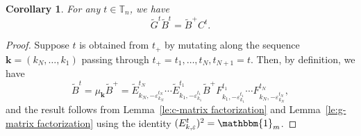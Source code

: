 \documentclass{amsart}
\newtheorem{corollary}[theorem]{Corollary}
\numberwithin{theorem}{section}
\newcommand{\bfk}{{\boldsymbol{k}}}
\newcommand{\TT}{\mathbb{T}}
\newcommand{\bOne}{\mathbbm{1}}
\begin{document}
  \begin{corollary}
    For any $t\in\TT_n$, we have
    \[\widetilde G^t\widetilde B^t=\widetilde B^+ C^t.\]
  \end{corollary}
  \begin{proof}
    Suppose $t$ is obtained from $t_+$ by mutating along the sequence $\bfk=(k_N,\ldots,k_1)$ passing through $t_+=t_1,\ldots,t_N,t_{N+1}=t$.
    Then, by definition, we have
    \[ \widetilde B^t = \mu_\bfk \widetilde B^+ = \widetilde E^{t_N}_{k_N,-\varepsilon^{t_N}_{k_N}}\cdots \widetilde E^{t_1}_{k_1,-\varepsilon^{t_1}_{k_1}} \widetilde B^+ F^{t_1}_{k_1,-\varepsilon^{t_1}_{k_1}}\cdots F^{t_N}_{k_N,-\varepsilon^{t_N}_{k_N}}, \]
    and the result follows from Lemma~\ref{le:c-matrix factorization} and Lemma~\ref{le:g-matrix factorization} using the identity $(E^t_{k,\varepsilon})^2=\bOne_m$.
  \end{proof}
\end{document}
